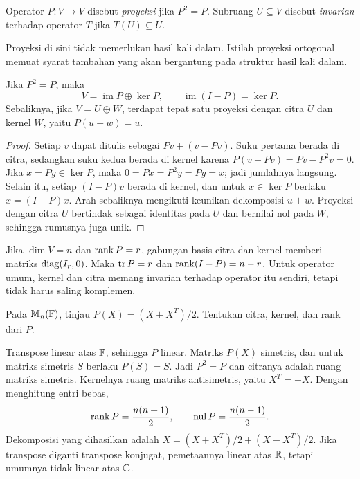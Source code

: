 \begin{definisi}
    Operator $P:V\to V$ disebut \emph{proyeksi} jika $P^2=P$.
    Subruang $U\subseteq V$ disebut \emph{invarian} terhadap
    operator $T$ jika $T(U)\subseteq U$.
\end{definisi}

Proyeksi di sini tidak memerlukan hasil kali dalam. Istilah
proyeksi ortogonal memuat syarat tambahan yang akan bergantung
pada struktur hasil kali dalam.

\begin{teorema}
    Jika $P^2=P$, maka
    \[
        V=\operatorname{im}P\oplus\ker P,\qquad
        \operatorname{im}(I-P)=\ker P.
    \]
    Sebaliknya, jika $V=U\oplus W$, terdapat tepat satu
    proyeksi dengan citra $U$ dan kernel $W$, yaitu $P(u+w)=u$.
\end{teorema}
\begin{proof}
    Setiap $v$ dapat ditulis sebagai $Pv+(v-Pv)$.
    Suku pertama berada di citra, sedangkan suku kedua berada
    di kernel karena $P(v-Pv)=Pv-P^2v=0$.
    Jika $x=Py\in\ker P$, maka $0=Px=P^2y=Py=x$;
    jadi jumlahnya langsung.
    Selain itu, setiap $(I-P)v$ berada di kernel, dan untuk
    $x\in\ker P$ berlaku $x=(I-P)x$.
    Arah sebaliknya mengikuti keunikan dekomposisi $u+w$.
    Proyeksi dengan citra $U$ bertindak sebagai identitas pada $U$
    dan bernilai nol pada $W$, sehingga rumusnya juga unik.
\end{proof}

Jika $\dim V=n$ dan $\operatorname{rank} P=r$, gabungan basis citra dan
kernel memberi matriks $\operatorname{diag}(I_r,0)$.
Maka $\operatorname{tr} P=r$ dan $\operatorname{rank}(I-P)=n-r$.
Untuk operator umum, kernel dan citra memang invarian terhadap
operator itu sendiri, tetapi tidak harus saling komplemen.

\begin{exam}
    Pada $\mathbb{M}_n(\mathbb{F})$, tinjau $P(X)=(X+X^T)/2$.
    Tentukan citra, kernel, dan rank dari $P$.
\end{exam}
\begin{solution}
    Transpose linear atas $\mathbb{F}$, sehingga $P$ linear.
    Matriks $P(X)$ simetris, dan untuk matriks simetris $S$
    berlaku $P(S)=S$. Jadi $P^2=P$ dan citranya adalah ruang
    matriks simetris. Kernelnya ruang matriks antisimetris,
    yaitu $X^T=-X$. Dengan menghitung entri bebas,
    \[
        \operatorname{rank} P=\frac{n(n+1)}2,\qquad
        \operatorname{nul} P=\frac{n(n-1)}2.
    \]
    Dekomposisi yang dihasilkan adalah
    $X=(X+X^T)/2+(X-X^T)/2$.
    Jika transpose diganti transpose konjugat, pemetaannya
    linear atas $\mathbb{R}$, tetapi umumnya tidak linear atas $\mathbb{C}$.
\end{solution}

